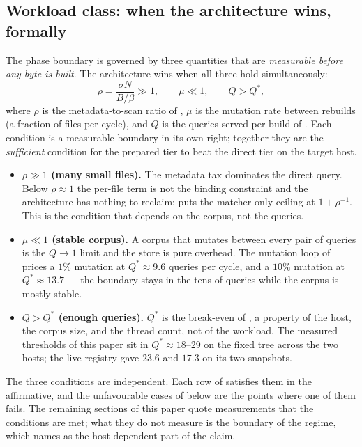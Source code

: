 \documentclass[11pt,letterpaper]{article}
\begin{document}
\subsection{Workload class: when the architecture wins, formally}

The phase boundary is governed by three quantities that are
\emph{measurable before any byte is built}. The architecture wins when all
three hold simultaneously:
\begin{equation}
\rho = \frac{\sigma N}{B/\beta} \gg 1, \qquad \mu \ll 1, \qquad Q > Q^{*},
\label{eq:winning-condition}
\end{equation}
where $\rho$ is the metadata-to-scan ratio of
, $\mu$ is the mutation rate between rebuilds (a
fraction of files per cycle), and $Q$ is the queries-served-per-build of
. Each condition is a measurable boundary in its own
right; together they are the \emph{sufficient} condition for the prepared
tier to beat the direct tier on the target host.

\begin{itemize}[leftmargin=*,itemsep=1pt]
\item \textbf{$\rho \gg 1$ (many small files).} The metadata tax dominates
  the direct query. Below $\rho \approx 1$ the per-file term is not the
  binding constraint and the architecture has nothing to reclaim;
   puts the matcher-only ceiling at $1 + \rho^{-1}$.
  This is the condition that depends on the corpus, not the queries.
\item \textbf{$\mu \ll 1$ (stable corpus).} A corpus that mutates between
  every pair of queries is the $Q \to 1$ limit and the store is pure
  overhead. The mutation loop of 
  prices a $1\%$ mutation at $Q^{*}\approx 9.6$ queries per cycle, and a
  $10\%$ mutation at $Q^{*}\approx 13.7$ --- the boundary stays in the
  tens of queries while the corpus is mostly stable.
\item \textbf{$Q > Q^{*}$ (enough queries).} $Q^{*}$ is the break-even of
  , a property of the host, the corpus size, and the
  thread count, not of the workload. The measured thresholds of this
  paper sit in $Q^{*}\!\approx\! 18$--$29$ on the fixed tree across the
  two hosts; the live registry gave $23.6$ and $17.3$ on its two
  snapshots.
\end{itemize}

The three conditions are independent. Each row of 
satisfies them in the affirmative, and the unfavourable cases of
 below are the points where one of them fails. The
remaining sections of this paper quote measurements that the conditions
are met; what they do not measure is the boundary of the regime, which
 names as the host-dependent part of the claim.
\end{document}
